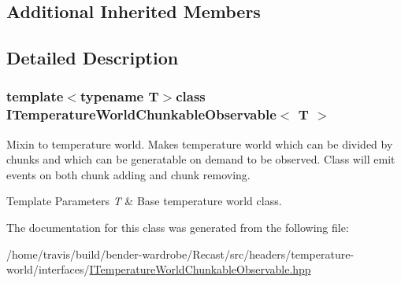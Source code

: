 \subsection*{Additional Inherited Members}


\subsection{Detailed Description}
\subsubsection*{template$<$typename T$>$class I\-Temperature\-World\-Chunkable\-Observable$<$ T $>$}

Mixin to temperature world. Makes temperature world which can be divided by chunks and which can be generatable on demand to be observed. Class will emit events on both chunk adding and chunk removing.


\begin{DoxyTemplParams}{Template Parameters}
{\em T} & Base temperature world class. \\
\hline
\end{DoxyTemplParams}


The documentation for this class was generated from the following file\-:\begin{DoxyCompactItemize}
\item 
/home/travis/build/bender-\/wardrobe/\-Recast/src/headers/temperature-\/world/interfaces/\hyperlink{_i_temperature_world_chunkable_observable_8hpp}{I\-Temperature\-World\-Chunkable\-Observable.\-hpp}\end{DoxyCompactItemize}

